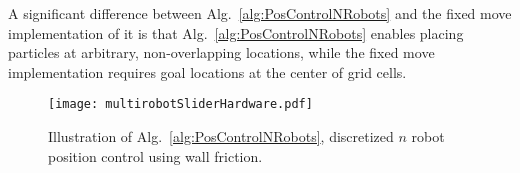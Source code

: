 A significant difference between Alg.~\ref{alg:PosControlNRobots} and the fixed move implementation of it is that Alg.~\ref{alg:PosControlNRobots}
enables placing particles at arbitrary, non-overlapping locations, while the fixed move implementation requires goal locations at the center of grid cells. 

\begin{figure}
\begin{center}
	\texttt{[image: multirobotSliderHardware.pdf]}
\end{center}
\vspace{-1em}
\caption{\label{fig:construction2d}
Illustration of Alg.\ \ref{alg:PosControlNRobots}, discretized $n$ robot position control  using wall friction.
}
\end{figure}

